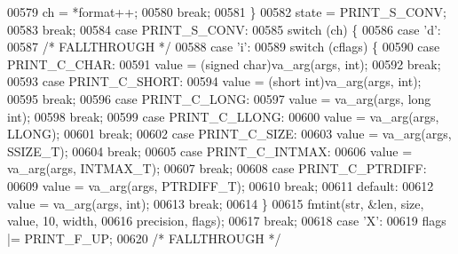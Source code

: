 \begin{DoxyCode}
{{00579                 ch = *format++;
00580                 \textcolor{keywordflow}{break};
00581             \}
00582             state = PRINT\_S\_CONV;
00583             \textcolor{keywordflow}{break};
00584         \textcolor{keywordflow}{case} PRINT\_S\_CONV:
00585             \textcolor{keywordflow}{switch} (ch) \{
00586             \textcolor{keywordflow}{case} \textcolor{charliteral}{'d'}:
00587                 \textcolor{comment}{/* FALLTHROUGH */}
00588             \textcolor{keywordflow}{case} \textcolor{charliteral}{'i'}:
00589                 \textcolor{keywordflow}{switch} (cflags) \{
00590                 \textcolor{keywordflow}{case} PRINT\_C\_CHAR:
00591                     value = (\textcolor{keywordtype}{signed} char)va\_arg(args, \textcolor{keywordtype}{int});
00592                     \textcolor{keywordflow}{break};
00593                 \textcolor{keywordflow}{case} PRINT\_C\_SHORT:
00594                     value = (\textcolor{keywordtype}{short} int)va\_arg(args, \textcolor{keywordtype}{int});
00595                     \textcolor{keywordflow}{break};
00596                 \textcolor{keywordflow}{case} PRINT\_C\_LONG:
00597                     value = va\_arg(args, \textcolor{keywordtype}{long} \textcolor{keywordtype}{int});
00598                     \textcolor{keywordflow}{break};
00599                 \textcolor{keywordflow}{case} PRINT\_C\_LLONG:
00600                     value = va\_arg(args, LLONG);
00601                     \textcolor{keywordflow}{break};
00602                 \textcolor{keywordflow}{case} PRINT\_C\_SIZE:
00603                     value = va\_arg(args, SSIZE\_T);
00604                     \textcolor{keywordflow}{break};
00605                 \textcolor{keywordflow}{case} PRINT\_C\_INTMAX:
00606                     value = va\_arg(args, INTMAX\_T);
00607                     \textcolor{keywordflow}{break};
00608                 \textcolor{keywordflow}{case} PRINT\_C\_PTRDIFF:
00609                     value = va\_arg(args, PTRDIFF\_T);
00610                     \textcolor{keywordflow}{break};
00611                 \textcolor{keywordflow}{default}:
00612                     value = va\_arg(args, \textcolor{keywordtype}{int});
00613                     \textcolor{keywordflow}{break};
00614                 \}
00615                 fmtint(str, &len, size, value, 10, width,
00616                     precision, flags);
00617                 \textcolor{keywordflow}{break};
00618             \textcolor{keywordflow}{case} \textcolor{charliteral}{'X'}:
00619                 flags |= PRINT\_F\_UP;
00620                 \textcolor{comment}{/* FALLTHROUGH */}
}}
\end{DoxyCode}
